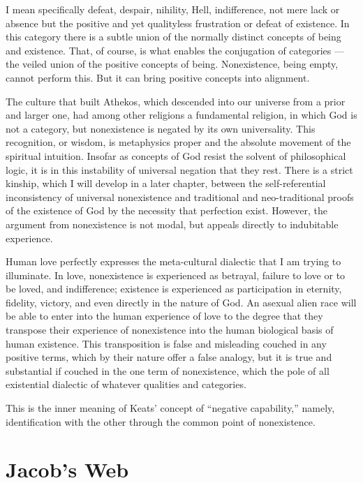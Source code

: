 \documentclass[english,11pt,letterpaper,onecolumn]{scrbook}
\begin{document}
	I mean specifically defeat, despair, nihility, Hell, indifference, not mere lack or absence but the positive and yet qualityless frustration or defeat of existence.  In this category there is a subtle union of the normally distinct concepts of being and existence. That, of course, is what enables the conjugation of categories --- the veiled union of the positive concepts of being. Nonexistence, being empty, cannot perform this. But it can bring positive concepts into alignment.

	The culture that built Athekos, which descended into our universe from a prior and larger one, had among other religions a fundamental religion, in which God is not a category, but nonexistence is negated by its own universality.  This recognition, or wisdom, is metaphysics proper and the absolute movement of the spiritual intuition.  Insofar as concepts of God resist the solvent of philosophical logic, it is in this instability of universal negation that they rest.  There is a strict kinship, which I will develop in a later chapter, between the self-referential inconsistency of universal nonexistence and traditional and neo-traditional proofs of the existence of God by the necessity that perfection exist.  However, the argument from nonexistence is not modal, but appeals directly to indubitable experience.

	Human love perfectly expresses the meta-cultural dialectic that I am trying to illuminate.  In love, nonexistence is experienced as betrayal, failure to love or to be loved, and indifference; existence is experienced as participation in eternity, fidelity, victory, and even directly in the nature of God.  An asexual alien race will be able to enter into the human experience of love to the degree that they transpose their experience of nonexistence into the human biological basis of human existence.  This transposition is false and misleading couched in any positive terms, which by their nature offer a false analogy, but it is true and substantial if couched in the one term of nonexistence, which the pole of all existential dialectic of whatever qualities and categories.
	
	This is the inner meaning of Keats' concept of ``negative capability,'' namely, identification with the other through the common point of nonexistence.
	
\chapter{Jacob's Web}
\end{document}
